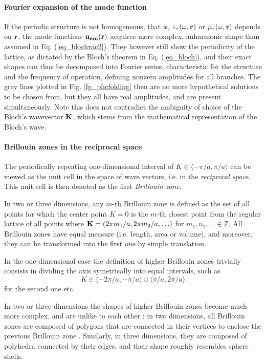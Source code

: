 \paragraph{Fourier expansion of the mode function}%
If the periodic structure is not homogeneous, that is, $\varepsilon_r(\omega,{\mathbf{r}})$ or $\mu_r(\omega,{\mathbf{r}})$ depends on ${\mathbf{r}}$, the mode functions $\mathbf{u_{em}}({\mathbf{r}})$ acquires more complex, anharmonic shape than assumed in Eq. (\ref{eq_blochvac2}). They however still show the periodicity of the lattice, as dictated by the Bloch's theorem in Eq. (\ref{eq_bloch}), and their exact shapes can thus be decomposed into Fourier series,
characteristic for the structure and the frequency of operation, defining nonzero amplitudes for all branches. The grey lines plotted in Fig. \ref{fg_phcfolding} then are no more hypothetical solutions to be chosen from, but they all have real amplitudes, and are present simultaneously. 
Note this does not contradict the ambiguity of choice of the Bloch's wavevector ${\mathbf{K}}$, which stems from the  mathematical representation of the Bloch's wave.

\paragraph{Brillouin zones in the reciprocal space} %

The periodically repeating one-dimensional interval of $K\in\langle-\pi/a, \pi/a\rangle$ can be viewed as the unit cell in the space of wave vectors, i.e. in the \textit{reciprocal space}. This unit cell is then denoted as the first \textit{Brillouin zone}. 

In two or three dimensions, any $m$-th Brillouin zone is defined as the set of all points for which the center point $K=0$ is the $m$-th closest point from the regular lattice of all points where ${\mathbf{K}} = (2\pi m_1/a, 2\pi m_2/a, \ldots)$ for $m_1, n_2, \ldots \in \mathbb{Z}$.
All Brillouin zones have equal measure (i.e. length, area or volume), and moreover, they can be transformed into the first one by simple translation. %

In the one-dimensional case the definition of higher Brillouin zones trivially consists in dividing the axis symetrically into equal intervals, such as $$K\in\langle-2\pi/a, -\pi/a\rangle \cup \langle \pi/a, 2\pi/a\rangle$$ for the second one etc. 

In two or three dimensions the shapes of higher Brillouin zones become much more complex, and are unlike to each other \cite[pp. 134--135]{klingshirn2007semiconductor}: in two dimensions, all Brillouin zones are composed of polygons that are connected in their vertices to enclose the previous Brillouin zone \cite[p. 126]{brillouin2003wave}. Similarly, in three dimensions, they are composed of polyhedra connected by their edges, and their shape roughly resembles sphere shells. 

